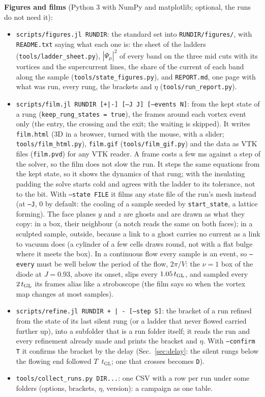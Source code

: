 \documentclass[11pt,a4paper]{article}
\newcommand{\tGL}{t_{\mathrm{GL}}}
\newcommand{\code}[1]{\texttt{#1}}
\begin{document}
\textbf{Figures and films} (Python 3 with NumPy and matplotlib; optional, the runs do not need it):
\begin{itemize}
\item \code{scripts/figures.jl RUNDIR}: the standard set into \code{RUNDIR/figures/}, with \code{README.txt} saying what each one
  is: the sheet of the ladders (\code{tools/ladder\_sheet.py}), $|\Psi_\mu|^2$ of every band on the three mid cuts with its
  vortices and the supercurrent lines, the share of the current of each band along the sample (\code{tools/state\_figures.py}),
  and \code{REPORT.md}, one page with what was run, every rung, the brackets and $\eta$ (\code{tools/run\_report.py}).
\item \code{scripts/film.jl RUNDIR [+|-] [--J J] [--events N]}: from the kept state of a rung (\code{keep\_rung\_states = true}), the
  frames around each vortex event only (the entry, the crossing and the exit; the waiting is skipped). It writes
  \code{film.html} (3D in a browser, turned with the mouse, with a slider; \code{tools/film\_html.py}), \code{film.gif}
  (\code{tools/film\_gif.py}) and the data as VTK files (\code{film.pvd}) for any VTK reader. A frame costs a few ms against a
  step of the solver, so the film does not slow the run. It steps the same equations from the kept state, so it shows the
  dynamics of that rung; with the insulating padding the solve starts cold and agrees with the ladder to its tolerance, not to
  the bit. With \code{--state FILE} it films any state file of the run's mesh instead (at \code{--J}, 0 by default: the cooling
  of a sample seeded by \code{start\_state}, a lattice forming). The face planes $y$ and $z$ are ghosts and are drawn as what they copy: in a box, their neighbour (a notch reads the
  same on both faces); in a sculpted sample, outside, because a link to a ghost carries no current as a link to vacuum does (a
  cylinder of a few cells draws round, not with a flat bulge where it meets the box). In a continuous flow every sample is an
  event, so \code{--every} must be well below the period of the flow, $2\pi/V$: the $\nu=1$ box of the diode at $J=0.93$, above its onset,
  slips every $1.05\,t_{\rm GL}$, and sampled every $2\,t_{\rm GL}$ its frames alias like a stroboscope (the film says so when the
  vortex map changes at most samples).
\item \code{scripts/refine.jl RUNDIR + | - [--step S]}: the bracket of a run refined from the state of its last silent rung (or a
  ladder that never flowed carried further up), into a subfolder that is a run folder itself; it reads the run and every
  refinement already made and prints the bracket and $\eta$. With \code{--confirm T} it confirms the bracket by the delay
  (Sec.~\ref{sec:delay}: the silent rungs below the flowing end followed $T$~$\tGL$; one that crosses becomes \code{D}).
\item \code{tools/collect\_runs.py DIR...}: one CSV with a row per run under some folders (options, brackets, $\eta$, version):
  a campaign as one table.
\end{itemize}
\end{document}
